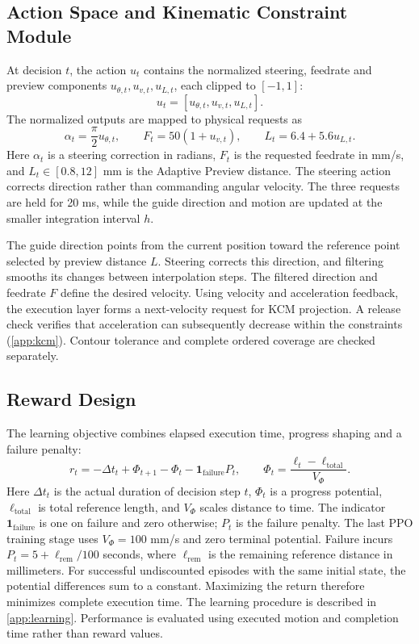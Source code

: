 \documentclass[preprint,12pt,nonatbib]{elsarticle}
\begin{document}
\subsection{Action Space and Kinematic Constraint Module}
At decision $t$, the action $u_t$ contains the normalized steering, feedrate and preview components $u_{\theta,t},u_{v,t},u_{L,t}$, each clipped to $[-1,1]$:
\begin{equation}
u_t=[u_{\theta,t},u_{v,t},u_{L,t}].
\end{equation}
The normalized outputs are mapped to physical requests as
\begin{equation}
\alpha_t=\frac{\pi}{2}u_{\theta,t},\qquad
F_t=50(1+u_{v,t}),\qquad
L_t=6.4+5.6u_{L,t}.
\label{eq:decode}
\end{equation}
Here $\alpha_t$ is a steering correction in radians, $F_t$ is the requested feedrate in mm/s, and $L_t\in[0.8,12]$ mm is the Adaptive Preview distance. The steering action corrects direction rather than commanding angular velocity. The three requests are held for 20 ms, while the guide direction and motion are updated at the smaller integration interval $h$.

The guide direction points from the current position toward the reference point selected by preview distance $L$. Steering corrects this direction, and filtering smooths its changes between interpolation steps. The filtered direction and feedrate $F$ define the desired velocity. Using velocity and acceleration feedback, the execution layer forms a next-velocity request for KCM projection. A release check verifies that acceleration can subsequently decrease within the constraints (\ref{app:kcm}). Contour tolerance and complete ordered coverage are checked separately.

\subsection{Reward Design}
The learning objective combines elapsed execution time, progress shaping and a failure penalty:
\begin{equation}
r_t=-\Delta t_t+\Phi_{t+1}-\Phi_t-\mathbf{1}_{\mathrm{failure}}P_t,
\qquad \Phi_t=\frac{\ell_t-\ell_{\mathrm{total}}}{V_\Phi}.
\label{eq:reward_total}
\end{equation}
Here $\Delta t_t$ is the actual duration of decision step $t$, $\Phi_t$ is a progress potential, $\ell_{\mathrm{total}}$ is total reference length, and $V_\Phi$ scales distance to time. The indicator $\mathbf{1}_{\mathrm{failure}}$ is one on failure and zero otherwise; $P_t$ is the failure penalty. The last PPO training stage uses $V_\Phi=100$ mm/s and zero terminal potential. Failure incurs $P_t=5+\ell_{\mathrm{rem}}/100$ seconds, where $\ell_{\mathrm{rem}}$ is the remaining reference distance in millimeters. For successful undiscounted episodes with the same initial state, the potential differences sum to a constant. Maximizing the return therefore minimizes complete execution time. The learning procedure is described in \ref{app:learning}. Performance is evaluated using executed motion and completion time rather than reward values.
\end{document}
